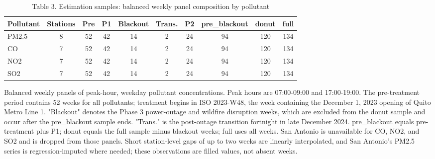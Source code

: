 \begin{table}[htbp]\centering
\begin{threeparttable}
\caption{Table 3. Estimation samples: balanced weekly panel composition by pollutant}
\begin{tabular}{lccccccccc}
\toprule
Pollutant & Stations & Pre & P1 & Blackout & Trans. & P2 & pre_blackout & donut & full \\
\midrule
PM2.5 & 8 & 52 & 42 & 14 & 2 & 24 & 94 & 120 & 134 \\
CO & 7 & 52 & 42 & 14 & 2 & 24 & 94 & 120 & 134 \\
NO2 & 7 & 52 & 42 & 14 & 2 & 24 & 94 & 120 & 134 \\
SO2 & 7 & 52 & 42 & 14 & 2 & 24 & 94 & 120 & 134 \\
\bottomrule
\end{tabular}
\begin{tablenotes}\footnotesize
\item Balanced weekly panels of peak-hour, weekday pollutant concentrations. Peak hours are 07:00-09:00 and 17:00-19:00. The pre-treatment period contains 52 weeks for all pollutants; treatment begins in ISO 2023-W48, the week containing the December 1, 2023 opening of Quito Metro Line 1. "Blackout" denotes the Phase 3 power-outage and wildfire disruption weeks, which are excluded from the donut sample and occur after the pre_blackout sample ends. "Trans." is the post-outage transition fortnight in late December 2024. pre_blackout equals pre-treatment plus P1; donut equals the full sample minus blackout weeks; full uses all weeks. San Antonio is unavailable for CO, NO2, and SO2 and is dropped from those panels. Short station-level gaps of up to two weeks are linearly interpolated, and San Antonio's PM2.5 series is regression-imputed where needed; these observations are filled values, not absent weeks.
\end{tablenotes}
\end{threeparttable}
\end{table}
